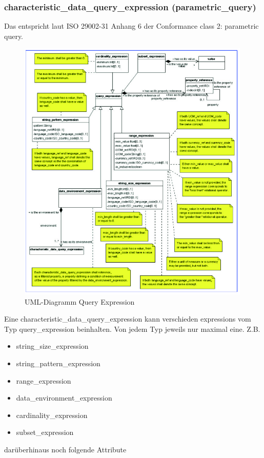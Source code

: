 \subsubsection{characteristic\_data\_query\_expression (parametric\_query)}\label{sec:characteristicdataqueryexpression}
Das entspricht laut ISO 29002-31 Anhang 6 der Conformance class 2: parametric query.

\begin{figure}[htbp]
	\centering
		\includegraphics[width=0.99\textwidth]{images/query_expression.jpg}
		\caption[UML-Diagramm Query Expression]{UML-Diagramm Query Expression\footnotemark}
	\label{fig:querymain}
\end{figure}

Eine characteristic\_data\_query\_expression kann verschieden expressions vom Typ query\_expression beinhalten. Von jedem Typ jeweils nur maximal eine. 
Z.B.
\begin{itemize}
\item string\_size\_expression
\item string\_pattern\_expression
\item range\_expression
\item data\_environment\_expression
\item cardinality\_expression
\item subset\_expression
\end{itemize}
darüberhinaus noch folgende Attribute

